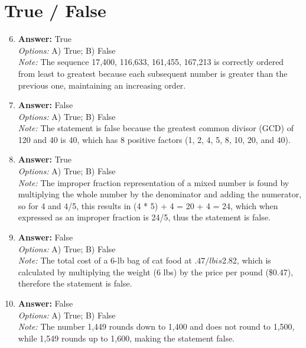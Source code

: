 \documentclass[12pt]{article}
\begin{document}
\section*{True / False}
\begin{enumerate}[label=\arabic*.]
\setcounter{enumi}{5}
\item \textbf{Answer:} True
\\ \textit{Options:} A) True; B) False
\\ \textit{Note:} The sequence 17,400, 116,633, 161,455, 167,213 is correctly ordered from least to greatest because each subsequent number is greater than the previous one, maintaining an increasing order.
\item \textbf{Answer:} False
\\ \textit{Options:} A) True; B) False
\\ \textit{Note:} The statement is false because the greatest common divisor (GCD) of 120 and 40 is 40, which has 8 positive factors (1, 2, 4, 5, 8, 10, 20, and 40).
\item \textbf{Answer:} True
\\ \textit{Options:} A) True; B) False
\\ \textit{Note:} The improper fraction representation of a mixed number is found by multiplying the whole number by the denominator and adding the numerator, so for 4 and 4/5, this results in (4 * 5) + 4 = 20 + 4 = 24, which when expressed as an improper fraction is 24/5, thus the statement is false.
\item \textbf{Answer:} False
\\ \textit{Options:} A) True; B) False
\\ \textit{Note:} The total cost of a 6-lb bag of cat food at $.47/lb is $2.82, which is calculated by multiplying the weight (6 lbs) by the price per pound (\$0.47), therefore the statement is false.
\item \textbf{Answer:} False
\\ \textit{Options:} A) True; B) False
\\ \textit{Note:} The number 1,449 rounds down to 1,400 and does not round to 1,500, while 1,549 rounds up to 1,600, making the statement false.
\end{enumerate}
\end{document}
